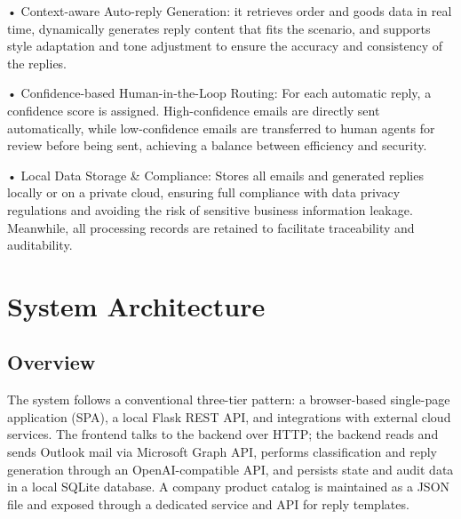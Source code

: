 \documentclass[12pt]{article}
\begin{document}
• Context-aware Auto-reply Generation: it retrieves order and goods data in real time, dynamically generates reply content that fits the scenario, and supports style adaptation and tone adjustment to ensure the accuracy and consistency of the replies.

• Confidence-based Human-in-the-Loop Routing: For each automatic reply, a confidence score is assigned. High-confidence emails are directly sent automatically, while low-confidence emails are transferred to human agents for review before being sent, achieving a balance between efficiency and security.

• Local Data Storage \& Compliance: Stores all emails and generated replies locally or on a private cloud, ensuring full compliance with data privacy regulations and avoiding the risk of sensitive business information leakage. Meanwhile, all processing records are retained to facilitate traceability and auditability.

\section{System Architecture}\label{sec:system-architecture}

\subsection{Overview}
The system follows a conventional three-tier pattern: a browser-based single-page application (SPA), a local Flask REST API, and integrations with external cloud services. The frontend talks to the backend over HTTP; the backend reads and sends Outlook mail via Microsoft Graph API, performs classification and reply generation through an OpenAI-compatible API, and persists state and audit data in a local SQLite database. A company product catalog is maintained as a JSON file and exposed through a dedicated service and API for reply templates.
\end{document}
